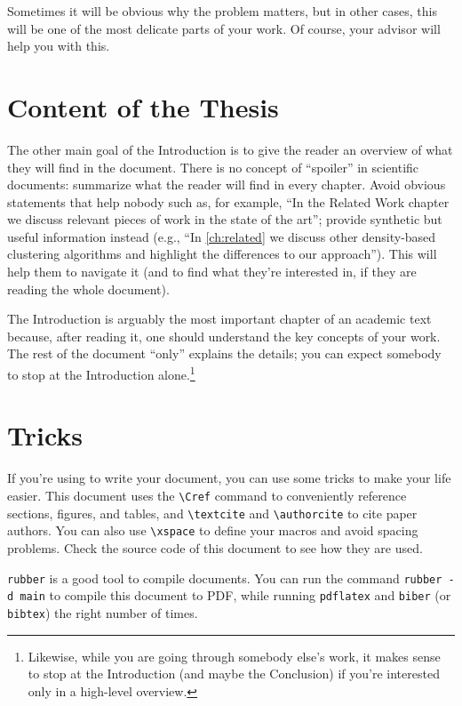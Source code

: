 Sometimes it will be obvious why the problem matters, but in other cases, this will be
one of the most delicate parts of your work. Of course, your advisor will help you with this.

\section{Content of the Thesis}

The other main goal of the Introduction is to give the reader an overview of what they will
find in the document. There is no concept of ``spoiler'' in scientific documents: summarize what the reader will find in every chapter. Avoid obvious statements that help nobody such as, for example, ``In the Related Work chapter we discuss relevant pieces of work in the state of the art''; provide synthetic but useful information instead (e.g., ``In \cref{ch:related} we discuss other density-based clustering algorithms and highlight the differences to our approach''). This will help them to navigate it (and to find what they're interested in, if they are reading the whole document).

The Introduction is arguably the most important
chapter of an academic text because, after reading it,
one should understand the key concepts of your work. The rest of the document
``only'' explains the details; you can expect somebody to stop at the Introduction alone.\footnote{Likewise, while you are going through somebody else's work, it makes sense to stop at the Introduction (and maybe the Conclusion) if you're interested only in a high-level overview.}

\section{\latex Tricks}

If you're using \latex to write your document, you can use some tricks to make your life
easier. This document uses the \verb|\Cref| command to conveniently reference sections, figures, and tables, and \verb|\textcite| and
\verb|\authorcite| to cite paper authors. You can also use \verb|\xspace| to define your macros
and avoid spacing problems. Check the source code of this document to see how they are used.

\texttt{rubber} is a good tool to compile \latex documents. You can run the command
\texttt{rubber -d main} to compile this document to PDF, while running \texttt{pdflatex}
and \texttt{biber} (or \texttt{bibtex}) the right number of times.

